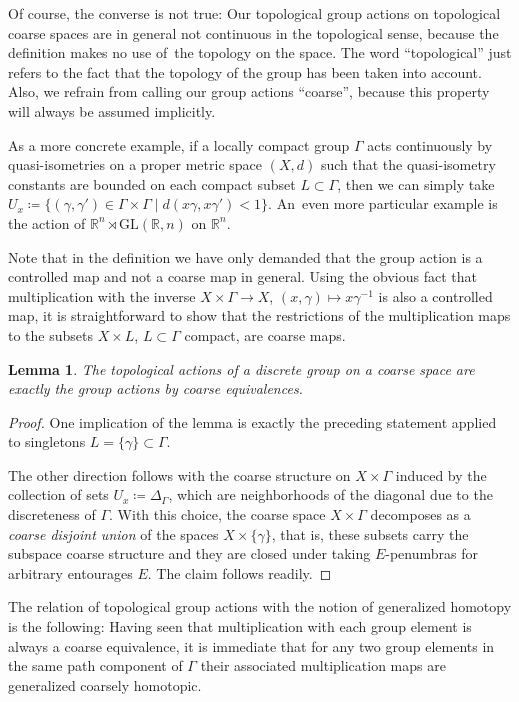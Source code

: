 \documentclass[pdftex]{sigma}
\numberwithin{equation}{section}
\newtheorem{lem}[thm]{Lemma}
\theoremstyle{definition}
\newcommand{\R}{\mathbb{R}}
\begin{document}
Of course, the converse is not true: Our topological group actions on topological coarse spaces are in general not continuous in the topological sense, because the definition makes no use of~the topology on the space.
The word ``topological'' just refers to the fact that the topology of the group has been taken into account. Also, we refrain from calling our group actions ``coarse'', because this property will always be assumed implicitly.

As a more concrete example, if a locally compact group $\Gamma$ acts continuously by quasi-isometries on a proper metric space $(X,d)$ such that the quasi-isometry constants are bounded on each compact subset $L\subset \Gamma$, then we can simply take $U_x\coloneqq \{(\gamma,\gamma')\in \Gamma\times \Gamma\mid d(x\gamma,x\gamma')<1\}$. An~even more particular example is the action of $\R^n\rtimes\mathrm{GL}(\R,n)$ on $\R^n$.

Note that in the definition we have only demanded that the group action is a controlled map and not a coarse map in general. Using the obvious fact that multiplication with the inverse $X\times \Gamma\to X$, $(x,\gamma)\mapsto x\gamma^{-1}$ is also a controlled map, it is straightforward to show that the restrictions of the multiplication maps to the subsets $X\times L$, $L\subset \Gamma$ compact, are coarse maps.

\begin{lem}
The topological actions of a \emph{discrete} group on a coarse space are exactly the group actions by coarse equivalences.
\end{lem}

\begin{proof}
One implication of the lemma is exactly the preceding statement applied to singletons $L=\{\gamma\}\subset \Gamma$.

The other direction follows with the coarse structure on $X\times \Gamma$ induced by the collection of sets $U_x\coloneqq\Delta_\Gamma$, which are neighborhoods of the diagonal due to the discreteness of $\Gamma$. With this choice, the coarse space $X\times \Gamma$ decomposes as a \emph{coarse disjoint union} of the spaces $X\times \{\gamma\}$, that is, these subsets carry the subspace coarse structure and they are closed under taking $E$-penumbras for arbitrary entourages $E$. The claim follows readily.
\end{proof}

The relation of topological group actions with the notion of generalized homotopy is the following:
Having seen that multiplication with each group element is always a coarse equivalence, it is immediate that for any two group elements in the same path component of $\Gamma$ their associated multiplication maps are generalized coarsely homotopic.
\end{document}
